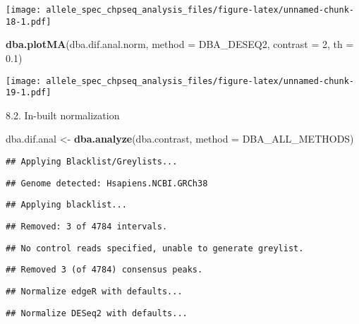 \documentclass[
]{article}
\newenvironment{Shaded}{\begin{snugshade}}{\end{snugshade}}
\newcommand{\DataTypeTok}[1]{\textcolor[rgb]{0.13,0.29,0.53}{#1}}
\newcommand{\DecValTok}[1]{\textcolor[rgb]{0.00,0.00,0.81}{#1}}
\newcommand{\FloatTok}[1]{\textcolor[rgb]{0.00,0.00,0.81}{#1}}
\newcommand{\KeywordTok}[1]{\textcolor[rgb]{0.13,0.29,0.53}{\textbf{#1}}}
\newcommand{\NormalTok}[1]{#1}
\newcommand{\StringTok}[1]{\textcolor[rgb]{0.31,0.60,0.02}{#1}}
\begin{document}
\texttt{[image: allele\_spec\_chpseq\_analysis\_files/figure-latex/unnamed-chunk-18-1.pdf]}

\begin{Shaded}
\begin{Highlighting}[]
\KeywordTok{dba.plotMA}\NormalTok{(dba.dif.anal.norm, }\DataTypeTok{method =}\NormalTok{ DBA_DESEQ2, }\DataTypeTok{contrast =} \DecValTok{2}\NormalTok{, }\DataTypeTok{th =} \FloatTok{0.1}\NormalTok{)}
\end{Highlighting}
\end{Shaded}

\texttt{[image: allele\_spec\_chpseq\_analysis\_files/figure-latex/unnamed-chunk-19-1.pdf]}

8.2. In-built normalization

\begin{Shaded}
\begin{Highlighting}[]
\NormalTok{dba.dif.anal <-}\StringTok{ }\KeywordTok{dba.analyze}\NormalTok{(dba.contrast, }\DataTypeTok{method =}\NormalTok{ DBA_ALL_METHODS)}
\end{Highlighting}
\end{Shaded}

\begin{verbatim}
## Applying Blacklist/Greylists...
\end{verbatim}

\begin{verbatim}
## Genome detected: Hsapiens.NCBI.GRCh38
\end{verbatim}

\begin{verbatim}
## Applying blacklist...
\end{verbatim}

\begin{verbatim}
## Removed: 3 of 4784 intervals.
\end{verbatim}

\begin{verbatim}
## No control reads specified, unable to generate greylist.
\end{verbatim}

\begin{verbatim}
## Removed 3 (of 4784) consensus peaks.
\end{verbatim}

\begin{verbatim}
## Normalize edgeR with defaults...
\end{verbatim}

\begin{verbatim}
## Normalize DESeq2 with defaults...
\end{verbatim}
\end{document}
